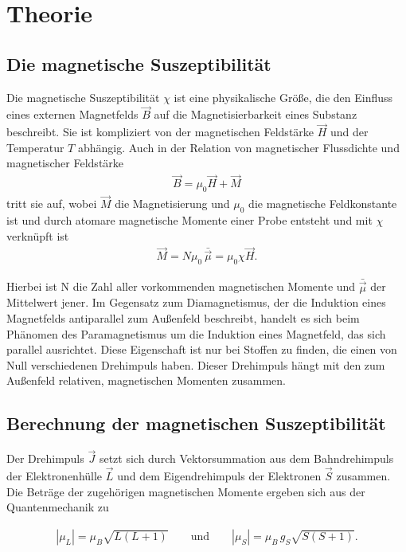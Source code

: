 
\section{Theorie}
\setcounter{page}{1}
\subsection{Die magnetische Suszeptibilität}
Die magnetische Suszeptibilität $\chi$ ist eine physikalische Größe, die den Einfluss eines externen Magnetfelds $\vec B$ auf
die Magnetisierbarkeit eines Substanz beschreibt. Sie ist kompliziert von der magnetischen Feldstärke $\vec H$ und der Temperatur $T$
abhängig. Auch in der Relation von magnetischer Flussdichte und magnetischer Feldstärke 
\begin{align}
 \vec B = \mu_0 \vec H + \vec M
\end{align}
tritt sie auf, wobei $\vec M$ die Magnetisierung und $\mu_0$ die magnetische Feldkonstante ist und durch atomare magnetische Momente einer Probe entsteht und mit $\chi$ verknüpft ist
\begin{align}
 \vec M = N \mu_0 \,  \bar{\vec{\mu}} =\mu_0 \chi \vec H.
 \label{eqMagnetisierung}
\end{align}

Hierbei ist N die Zahl aller vorkommenden magnetischen Momente und $\bar{\vec{\mu}}$ der Mittelwert jener. Im Gegensatz zum Diamagnetismus, der die Induktion eines Magnetfelds antiparallel zum Außenfeld beschreibt, handelt es sich beim
Phänomen des Paramagnetismus um die Induktion eines Magnetfeld, das sich parallel ausrichtet. Diese Eigenschaft ist nur bei Stoffen
zu finden, die einen von Null verschiedenen Drehimpuls haben. Dieser Drehimpuls hängt mit den zum Außenfeld relativen, magnetischen 
Momenten zusammen.

\subsection{Berechnung der magnetischen Suszeptibilität}
Der Drehimpuls $\vec J$ setzt sich durch Vektorsummation aus dem Bahndrehimpuls der Elektronenhülle $\vec L$ und dem Eigendrehimpuls der Elektronen 
$\vec S$ zusammen. Die Beträge der zugehörigen magnetischen Momente ergeben sich aus der Quantenmechanik zu

\begin{align}
 | \mu_L | = \mu_B \sqrt{L(L+1)} \qquad \text{und} \qquad |\mu_S| = \mu_B \, g_S \sqrt{S(S+1)}.
\end{align}

